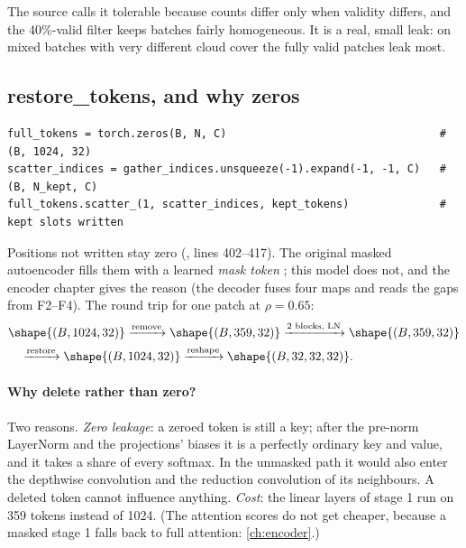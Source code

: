 The source calls it tolerable because counts differ only when validity differs, and the 40\%-valid
filter keeps batches fairly homogeneous. It is a real, small leak: on mixed batches with very different
cloud cover the fully valid patches leak most.

\subsection{restore\_tokens, and why zeros}

\begin{lstlisting}
full_tokens = torch.zeros(B, N, C)                                 # (B, 1024, 32)
scatter_indices = gather_indices.unsqueeze(-1).expand(-1, -1, C)   # (B, N_kept, C)
full_tokens.scatter_(1, scatter_indices, kept_tokens)              # kept slots written
\end{lstlisting}
Positions not written stay zero (, lines 402--417). The original masked
autoencoder fills them with a learned \emph{mask token} \citep{he2022masked}; this model does not, and
the encoder chapter gives the reason (the decoder fuses four maps and reads the gaps from F2--F4). The
round trip for one patch at $\rho = 0.65$:
\[
\begin{aligned}
&\shape{(B, 1024, 32)} \xrightarrow{\text{remove}} \shape{(B, 359, 32)} \xrightarrow{\text{2 blocks, LN}} \shape{(B, 359, 32)}\\
&\quad\xrightarrow{\text{restore}} \shape{(B, 1024, 32)} \xrightarrow{\text{reshape}} \shape{(B, 32, 32, 32)} .
\end{aligned}
\]


\paragraph{Why delete rather than zero?} Two reasons. \emph{Zero leakage}: a zeroed token is still a
key; after the pre-norm LayerNorm and the projections' biases it is a perfectly ordinary key and value,
and it takes a share of every softmax. In the unmasked path it would also enter the depthwise
convolution and the reduction convolution of its neighbours. A deleted token cannot influence anything. \emph{Cost}: the linear layers of stage 1 run on
359 tokens instead of 1024. (The attention scores do not get cheaper, because a masked stage 1 falls
back to full attention: \cref{ch:encoder}.)

